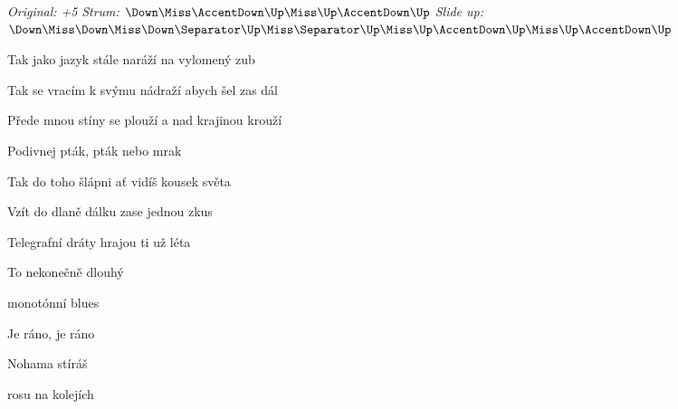 \begin{song}


\begin{headerbox}
\RaiseBoxWithAccents
\textit{Original: +5} \quad
\textit{Strum:} $\Down\Miss\AccentDown\Up\Miss\Up\AccentDown\Up$ \quad
\textit{Slide up:} $\Down\Miss\Down\Miss\Down \Separator \Up\Miss \Separator \Up\Miss\Up\AccentDown\Up\Miss\Up\AccentDown\Up$
\end{headerbox}

\begin{hchordbox}
\end{hchordbox}

\Large

\bigskip

Tak jako jazyk stále naráží na vylomený zub \par
Tak se vracím k svýmu nádraží abych šel zas dál \par
Přede mnou stíny se plouží a nad krajinou krouží \par
Podivnej pták,   pták nebo mrak \par

\bigskip

\begin{chorusboxwide}{\Refren}
Tak do toho šlápni ať vidíš kousek světa \par
Vzít do dlaně dálku  zase jednou zkus \par
Telegrafní dráty  hrajou ti už léta \par
To nekonečně dlouhý \par
{} monotónní blues \par

\bigskip

Je ráno, je ráno \par
Nohama stíráš \par
{}rosu na kolejích \par
\end{chorusboxwide}


\end{song}
